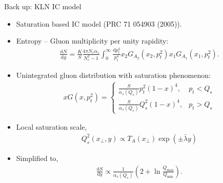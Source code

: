 \documentclass[11pt]{beamer}
\begin{document}
\begin{frame}[noframenumbering]{Back up: KLN IC model}
\begin{itemize}
\item Saturation based IC model (PRC 71 054903 (2005)).
\item Entropy -- Gluon multiplicity per unity rapidity:
\begin{eqnarray}
\nonumber
\frac{\mathrm{d}N}{\mathrm{d}y} = \frac{K}{S} \frac{4\pi N_c \alpha_s}{N_c^2 - 1} \int_{0}^{\infty}\frac{\mathrm{d}p^2_t}{p^4_t} x_2 G_{A_2}(x_2, p^2_t) x_1 G_{A_1}(x_1, p^2_t).
\end{eqnarray}
\item Unintegrated gluon distribution with saturation phenomenon:
\begin{eqnarray}
\nonumber
x G(x, p^2_t) = 
\begin{cases}
\frac{S}{\alpha_s(Q_s)}p_t^2(1-x)^4, & p_t < Q_s \\
\frac{S}{\alpha_s(Q_s)}Q_s^2(1-x)^4, & p_t > Q_s
\end{cases}
\end{eqnarray}
\item Local saturation scale,
\begin{eqnarray}
\nonumber
Q_s^2(x_\perp, y) \propto T_A(x_\perp) \exp(\pm\bar{\lambda} y)
\end{eqnarray} 
\item Simplified to,
\begin{eqnarray}
\nonumber
\frac{\mathrm{d}S}{\mathrm{d}y} \propto \frac{1}{\alpha_s(Q_s)} \left( 2 + \ln \frac{Q_{\textrm{max}}}{Q_{\textrm{min}}} \right).
\end{eqnarray}
\end{itemize}
\end{frame}
\end{document}
